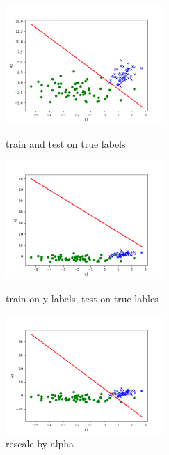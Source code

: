 \begin{answer}
    \begin{figure}[htbp]
        \centering
        \begin{minipage}[t]{0.48\textwidth}
        \centering
        \includegraphics[width=6cm]{../src/output/p02c_pred.png}
        \caption{train and test on true labels}
        \end{minipage}
        \begin{minipage}[t]{0.48\textwidth}
        \centering
        \includegraphics[width=6cm]{../src/output/p02d_pred.png}
        \caption{train on y labels, test on true lables}
        \end{minipage}
        \begin{minipage}[t]{0.48\textwidth}
        \centering
        \includegraphics[width=6cm]{../src/output/p02e_pred.png}
        \caption{rescale by alpha}
        \end{minipage}
    \end{figure}
\end{answer}
